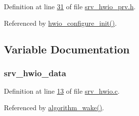 Definition at line \hyperlink{a00034_source_l00031}{31} of file \hyperlink{a00034_source}{srv\+\_\+hwio\+\_\+prv.\+h}.



Referenced by \hyperlink{a00056_source_l00041}{hwio\+\_\+configure\+\_\+init()}.



\subsection{Variable Documentation}
\hypertarget{a00034_a0fd91014631926f362c7c2b2f5d143b0}{
\subsubsection[{srv\+\_\+hwio\+\_\+data}]{ srv\+\_\+hwio\+\_\+data}}\label{a00034_a0fd91014631926f362c7c2b2f5d143b0}


Definition at line \hyperlink{a00056_source_l00013}{13} of file \hyperlink{a00056_source}{srv\+\_\+hwio.\+c}.



Referenced by \hyperlink{a00038_source_l00670}{algorithm\+\_\+wake()}.

